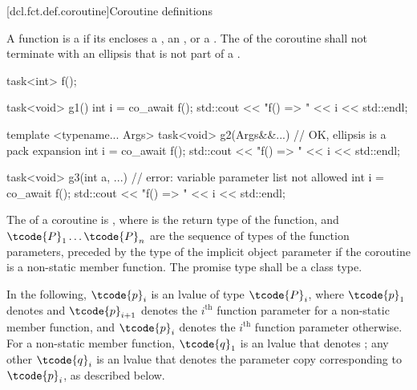 [dcl.fct.def.coroutine]{Coroutine definitions}%
%

\pnum
A function is a  if its  encloses a
,
an ,
or a .
The  of the coroutine shall not
terminate with an ellipsis that is not part of
a .

\pnum
\begin{example}
\begin{codeblock}
task<int> f();

task<void> g1() {
  int i = co_await f();
  std::cout << "f() => " << i << std::endl;
}

template <typename... Args>
task<void> g2(Args&&...) {      // OK, ellipsis is a pack expansion
  int i = co_await f();
  std::cout << "f() => " << i << std::endl;
}

task<void> g3(int a, ...) {     // error: variable parameter list not allowed
  int i = co_await f();
  std::cout << "f() => " << i << std::endl;
}
\end{codeblock}
\end{example}

\pnum
{}%
The  of a coroutine is
,
where
 is the return type of the function, and
$\tcode{P}_1 \dotsc \tcode{P}_n$ are the sequence of types of the function parameters,
preceded by the type of the implicit object parameter
if the coroutine is a non-static member function.
The promise type shall be a class type.

\pnum
In the following, $\tcode{p}_i$ is an lvalue of type $\tcode{P}_i$,
where
$\tcode{p}_1$ denotes  and
$\tcode{p}_{i+1}$ denotes the $i^\textrm{th}$ function parameter
for a non-static member function, and
$\tcode{p}_i$ denotes
the $i^\textrm{th}$ function parameter otherwise.
For a non-static member function,
$\tcode{q}_1$ is an lvalue that denotes ;
any other $\tcode{q}_i$ is an lvalue
that denotes the parameter copy corresponding to $\tcode{p}_i$,
as described below.

